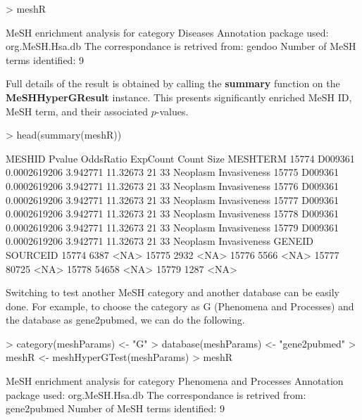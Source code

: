\documentclass[11pt]{article}
\begin{document}
\begin{center}
\begin{Schunk}
\begin{Sinput}
> meshR
\end{Sinput}
\begin{Soutput}
MeSH enrichment analysis for category Diseases 
Annotation package used:  org.MeSH.Hsa.db 
The correspondance is retrived from:  gendoo 
Number of MeSH terms identified:  9 
\end{Soutput}
\end{Schunk}
\end{center}

Full details of the result is obtained by calling the \textbf{summary} function on the \textbf{MeSHHyperGResult} instance.
This presents significantly enriched MeSH ID, MeSH term, and their associated $p$-values.

\begin{center}
\begin{Schunk}
\begin{Sinput}
> head(summary(meshR))
\end{Sinput}
\begin{Soutput}
       MESHID       Pvalue OddsRatio ExpCount Count Size              MESHTERM
15774 D009361 0.0002619206  3.942771 11.32673    21   33 Neoplasm Invasiveness
15775 D009361 0.0002619206  3.942771 11.32673    21   33 Neoplasm Invasiveness
15776 D009361 0.0002619206  3.942771 11.32673    21   33 Neoplasm Invasiveness
15777 D009361 0.0002619206  3.942771 11.32673    21   33 Neoplasm Invasiveness
15778 D009361 0.0002619206  3.942771 11.32673    21   33 Neoplasm Invasiveness
15779 D009361 0.0002619206  3.942771 11.32673    21   33 Neoplasm Invasiveness
      GENEID SOURCEID
15774   6387     <NA>
15775   2932     <NA>
15776   5566     <NA>
15777  80725     <NA>
15778  54658     <NA>
15779   1287     <NA>
\end{Soutput}
\end{Schunk}
\end{center}

Switching to test another MeSH category and another database can be easily done.
For example, to choose the category as G (Phenomena and Processes) and the database as gene2pubmed, we can do the following.

\begin{center}
\begin{Schunk}
\begin{Sinput}
> category(meshParams) <- "G"
> database(meshParams) <- "gene2pubmed"
> meshR <- meshHyperGTest(meshParams)
> meshR
\end{Sinput}
\begin{Soutput}
MeSH enrichment analysis for category Phenomena and Processes 
Annotation package used:  org.MeSH.Hsa.db 
The correspondance is retrived from:  gene2pubmed 
Number of MeSH terms identified:  9 
\end{Soutput}
\end{Schunk}
\end{center}
\end{document}
